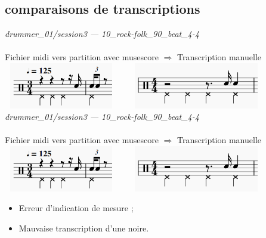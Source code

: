 \subsection*{comparaisons de transcriptions}
\textit{drummer\_01/session3 — 10\_rock-folk\_90\_beat\_4-4}\\\\
Fichier midi vers partition avec musescore $\Rightarrow$ Transcription manuelle\\
\includegraphics[height=20mm, width=50mm]{z_images/transcriptions_manuelles/0_prise_en_main/0_tests_drummer_01__session3/musescore_0.png}\ \ \ \ 
\includegraphics[height=20mm, width=55mm]{z_images/transcriptions_manuelles/0_prise_en_main/0_tests_drummer_01__session3/manuel_0.png}
\textit{drummer\_01/session3 — 10\_rock-folk\_90\_beat\_4-4}\\\\
Fichier midi vers partition avec musescore $\Rightarrow$ Transcription manuelle\\
\includegraphics[height=20mm, width=50mm]{z_images/transcriptions_manuelles/0_prise_en_main/0_tests_drummer_01__session3/musescore_0.png}\ \ \ \ 
\includegraphics[height=20mm, width=55mm]{z_images/transcriptions_manuelles/0_prise_en_main/0_tests_drummer_01__session3/manuel_0.png}
\begin{itemize}
	\item Erreur d’indication de mesure ;
	\item Mauvaise transcription d’une noire.\\
\end{itemize}
